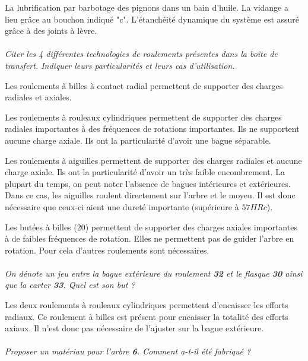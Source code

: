 \documentclass[11pt,oneside]{article}
\begin{document}
La lubrification par barbotage des pignons dans un bain d'huile. La vidange a lieu grâce au bouchon indiqué "c". L'étanchéité dynamique du système est assuré grâce à des joints à lèvre. 

\paragraph{}
\textit{Citer les 4 différentes technologies de roulements présentes dans la boîte de transfert. Indiquer leurs particularités et leurs cas d'utilisation.}

Les roulements à billes à contact radial permettent de supporter des charges radiales et axiales. 

Les roulements à rouleaux cylindriques permettent de supporter des charges radiales importantes à des fréquences de rotations importantes. Ils ne supportent aucune charge axiale. Ils ont la particularité d'avoir une bague séparable.

Les roulements à aiguilles permettent de supporter des charges radiales et aucune charge axiale. Ils ont la particularité d'avoir un très faible encombrement. La plupart du temps, on peut noter l'absence de bagues intérieures et extérieures. Dans ce cas, les aiguilles roulent directement sur l'arbre et le moyeu. Il est donc nécessaire que ceux-ci aient une dureté importante (supérieure à $57 HRc$).

Les butées à billes (20) permettent de supporter des charges axiales importantes à de faibles fréquences de rotation. Elles ne permettent pas de guider l'arbre en rotation. Pour cela d'autres roulements sont nécessaires.  

\paragraph{}
\textit{On dénote un jeu entre la bague extérieure du roulement \textbf{32} et le flasque \textbf{30} ainsi que la carter \textbf{33}. Quel est son but ?}

Les deux roulements à rouleaux cylindriques permettent d'encaisser les efforts radiaux. Ce roulement à billes est présent pour encaisser la totalité des efforts axiaux. Il n'est donc pas nécessaire de l'ajuster sur la bague extérieure. 

\paragraph{}
\textit{Proposer un matériau pour l'arbre \textbf{6}. Comment a-t-il été fabriqué ?}
\end{document}
